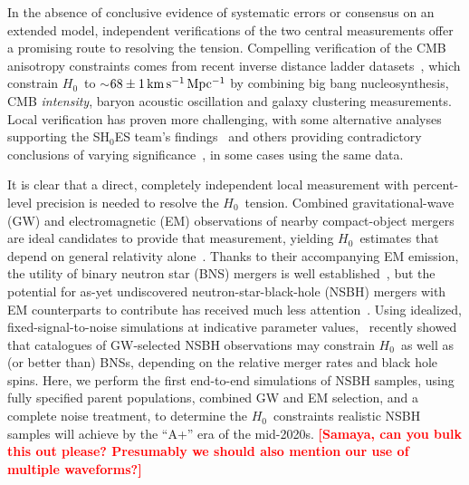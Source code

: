 \documentclass[%
 reprint,
 superscriptaddress,
 nofootinbib,
 amsmath,amssymb,
 aps,
]{revtex4-2}
\newcommand{\hubble}{\ensuremath{H_0}}
\newcommand{\kmsmpc}{\ensuremath{{\rm km\,s^{-1}\,Mpc^{-1}}}}
\newcommand{\smf}[1]{\textcolor{red}{\bf [#1]}}
\begin{document}
In the absence of conclusive evidence of systematic errors or consensus on an extended model, independent verifications of the two central measurements offer a promising route to resolving the tension. Compelling verification of the CMB anisotropy constraints comes from recent inverse distance ladder datasets~\cite{Addison_etal:2017,DES_H_0:2017,Philcox_etal:2020}, which constrain \hubble\ to $\sim$$68 \pm 1\,\kmsmpc$ by combining big bang nucleosynthesis, CMB {\it intensity}, baryon acoustic oscillation and galaxy clustering measurements. Local verification has proven more challenging, with some alternative analyses supporting the SH$_0$ES team's findings~\cite{Yuan_etal:2019,Huang_etal:2020,H0LICOW_XIII:2020,TDCOSMO_I:2020,Pesce_etal:2020} and others providing contradictory conclusions of varying significance~\cite{Freedman_etal:2019,Freedman_etal:2020,TDCOSMO_IV:2020,Boruah_etal:2020}, in some cases using the same data.

It is clear that a direct, completely independent local measurement with percent-level precision is needed to resolve the \hubble\ tension. Combined gravitational-wave (GW) and electromagnetic (EM) observations of nearby compact-object mergers are ideal candidates to provide that measurement, yielding \hubble\ estimates that depend on general relativity alone~\cite{Schutz:1986,Holz_Hughes:2005,Dalal:2006,Nissanke_etal:2010,Taylor_etal:2012,Messenger_Read:2012,Nissanke_etal:2013,Oguri:2016,delPozzo:2017,Abbott_etal:2017a,Seto:2018,Chen_etal:2018,Fishbach_etal:2018,Feeney_etal:2018,Mortlock_etal:2019,Soares-Santos_etal:2019,Gray_etal:2019,Palmese_etal:2020,Vasylyev_Filippenko:2020,Chen_etal:2020,Gayathri_etal:2020,Mukherjee_etal:2020}. Thanks to their accompanying EM emission, the utility of binary neutron star (BNS) mergers is well established~\cite{Dalal:2006,Nissanke_etal:2010,Taylor_etal:2012,Messenger_Read:2012,Nissanke_etal:2013,Oguri:2016,delPozzo:2017,Abbott_etal:2017a,Seto:2018,Chen_etal:2018,Fishbach_etal:2018,Feeney_etal:2018,Mortlock_etal:2019,Gray_etal:2019}, but the potential for as-yet undiscovered neutron-star-black-hole (NSBH) mergers with EM counterparts to contribute has received much less attention~\cite{Nissanke_etal:2010,Nissanke_etal:2013,Vitale_Chen:2018}. Using idealized, fixed-signal-to-noise simulations at indicative parameter values,~\citet{Vitale_Chen:2018} recently showed that catalogues of GW-selected NSBH observations may constrain \hubble\ as well as (or better than) BNSs, depending on the relative merger rates and black hole spins. Here, we perform the first end-to-end simulations of NSBH samples, using fully specified parent populations, combined GW and EM selection, and a complete noise treatment, to determine the \hubble\ constraints realistic NSBH samples will achieve by the ``A+'' era of the mid-2020s.  \smf{Samaya, can you bulk this out please? Presumably we should also mention our use of multiple waveforms?}
\end{document}
